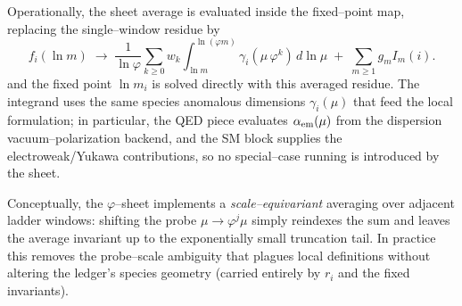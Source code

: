 \documentclass[11pt]{article}
\begin{document}
Operationally, the sheet average is evaluated inside the fixed--point map, replacing the single--window residue by
\begin{equation}\label{eq:invariants}
f_i(\ln m)\;\to\;\frac{1}{\ln\varphi}\sum_{k\ge0} w_k\!\!\int_{\ln m}^{\ln(\varphi m)}\!\!\gamma_i(\mu\,\varphi^k)\, d\ln\mu \;+\;\sum_{m\ge1} g_m I_m(i).
\end{equation}
and the fixed point $\ln m_i$ is solved directly with this averaged residue. The integrand uses the same species anomalous dimensions $\gamma_i(\mu)$ that feed the local formulation; in particular, the QED piece evaluates $\alpha_{\rm em}(\mu)$ from the dispersion vacuum–polarization backend, and the SM block supplies the electroweak/Yukawa contributions, so no special--case running is introduced by the sheet.

Conceptually, the $\varphi$--sheet implements a \emph{scale–equivariant} averaging over adjacent ladder windows: shifting the probe $\mu\!\to\!\varphi^j\mu$ simply reindexes the sum and leaves the average invariant up to the exponentially small truncation tail. In practice this removes the probe--scale ambiguity that plagues local definitions without altering the ledger’s species geometry (carried entirely by $r_i$ and the fixed invariants).
\end{document}
